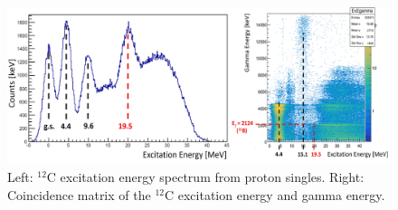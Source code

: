 \begin{figure}[!h]
    \centering
    \includegraphics[width=1.0\linewidth]{graphics/stretched_states.png}
    \caption{Left: $^{12}$C excitation energy spectrum from proton singles. Right: Coincidence matrix of the $^{12}$C excitation energy and gamma energy.}
    \label{fig:stretched_statest}
\end{figure}

